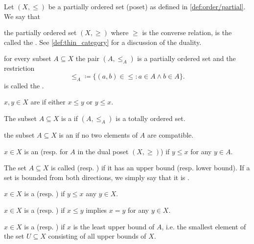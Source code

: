 \begin{definition}\label{def:poset}
  Let \( (X, \leq) \) be a partially ordered set (poset) as defined in \cref{def:order/partial}. We say that

  \begin{defenum}
     the partially ordered set \( (X, \geq) \) where \( \geq \) is the converse relation, is the called the . See \cref{def:thin_category} for a discussion of the duality.

     for every subset \( A \subseteq X \) the pair \( (A, \leq_A) \) is a partially ordered set and the restriction
    \begin{equation*}
      \leq_A \coloneqq \{ (a, b) \in \leq \colon a \in A \land b \in A \}.
    \end{equation*}
    is called the .

     \( x, y \in X \) are  if either \( x \leq y \) or \( y \leq x \).

     The subset \( A \subseteq X \) is a  if \( (A, \leq_A) \) is a totally ordered set.

     the subset \( A \subseteq X \) is an  if no two elements of \( A \) are compatible.

    \cite[170]{Enderton1977} \( x \in X \) is an  (resp.  for \( A \) in the dual poset \( (X, \geq) \)) if \( y \leq x \) for any \( y \in A \).

     The set \( A \subseteq X \) is called  (resp. ) if it has an upper bound (resp. lower bound). If a set is bounded from both directions, we simply say that it is .

    \cite[171]{Enderton1977} \( x \in X \) is a  (resp. ) if \( y \leq x \) any \( y \in X \).

    \cite[170]{Enderton1977} \( x \in X \) is a  (resp. ) if \( x \leq y \) implies \( x = y \) for any \( y \in X \).

    \cite[170]{Enderton1977} \( x \in X \) is a  (resp. ) if \( x \) is the least upper bound of \( A \), i.e. the smallest element of the set \( U \subseteq X \) consisting of all upper bounds of \( X \).
  \end{defenum}
\end{definition}

